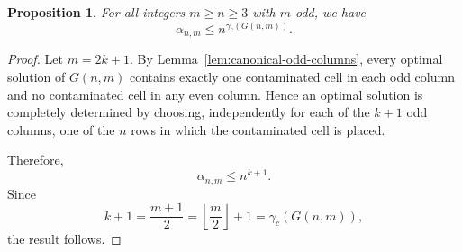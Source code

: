 \documentclass[letterpaper,12pt]{article}
\newtheorem{proposition}{Proposition}
\begin{document}
\begin{table}[H]
\centering
{}
\caption{Permutations of $G(7,7)$ optimal solutions and their images in $\mathcal{S}_4$.}
\label{tab:sol_of_7_7}
\end{table}




 
\begin{proposition}\label{prop:odd-m-upper-bound}
For all integers $m\ge n\ge 3$ with $m$ odd, we have
\begin{equation}
    \alpha_{n,m}\le n^{\gamma_c(G(n,m))}.
\end{equation}
\end{proposition}

\begin{proof}
Let $m=2k+1$. By Lemma~\ref{lem:canonical-odd-columns}, every optimal solution of $G(n,m)$ contains exactly one contaminated cell in each odd column and no contaminated cell in any even column. Hence an optimal solution is completely determined by choosing, independently for each of the $k+1$ odd columns, one of the $n$ rows in which the contaminated cell is placed.

Therefore,
\[
\alpha_{n,m}\le n^{k+1}.
\]
Since
\[
k+1=\frac{m+1}{2}=\left\lfloor \frac m2\right\rfloor+1=\gamma_c(G(n,m)),
\]
the result follows.\qedhere
\end{proof}
 
\end{document}
